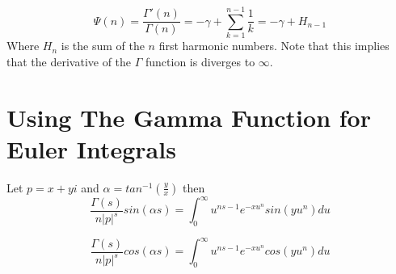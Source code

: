 \documentclass[a4paper]{article}
\begin{document}
    \begin{equation}
        \Psi(n) = \frac{\Gamma'(n)}{\Gamma(n)} = -\gamma + \sum_{k=1}^{n-1} \frac{1}{k} = -\gamma + H_{n-1} \label{gf:eq:equation17}
    \end{equation}
    Where $H_{n}$ is the sum of the $n$ first harmonic numbers.
    Note that this implies that the derivative of the $\Gamma$ function is diverges to $\infty$.


    \section{Using The Gamma Function for Euler Integrals} \label{gf:sec:using-the-gamma-function-for-euler-integrals}

    \begin{theorem}
        Let
        $p = x + yi$ and
        $\alpha =tan^{-1} \left( \frac{y}{x} \right)$ then
        \begin{equation}
            \label{gf:eq:sin-gamma-integral}
            \boxed{
                \frac{\Gamma(s)}{n |p|^s} sin(\alpha s)= \int_{0}^{\infty} u^{ns -1} e^{-x u^{n}} sin(y u^n) du
            }
        \end{equation}

        \begin{equation}
            \label{gf:eq:cos-gamma-integral}
            \boxed{
                \frac{\Gamma(s)}{n |p|^s} cos(\alpha s)= \int_{0}^{\infty} u^{ns -1} e^{-x u^{n}} cos(y u^n) du
            }
        \end{equation}


\end{theorem}
\end{document}
